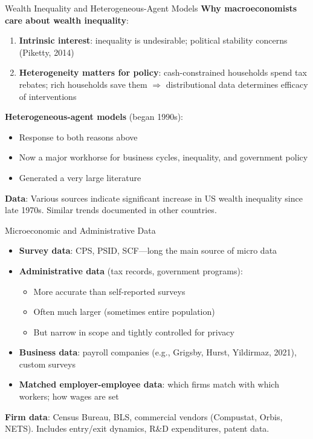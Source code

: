 \documentclass[blue]{beamer}
\begin{document}
\begin{frame}{Wealth Inequality and Heterogeneous-Agent Models}
	\textbf{Why macroeconomists care about wealth inequality}:
		\vspace{-6pt}
	\begin{enumerate}
		\item \textbf{Intrinsic interest}: inequality is undesirable; political stability concerns (Piketty, 2014)
		\item \textbf{Heterogeneity matters for policy}: cash-constrained households spend tax rebates; rich households save them $\Rightarrow$ distributional data determines efficacy of interventions
	\end{enumerate}
	
	\textbf{Heterogeneous-agent models} (began 1990s):
		\vspace{-6pt}
	\begin{itemize}
		\item Response to both reasons above
		\item Now a major workhorse for business cycles, inequality, and government policy
		\item Generated a very large literature
	\end{itemize}
	
	
	\textbf{Data}: Various sources indicate significant increase in US wealth inequality since late 1970s. Similar trends documented in other countries.
\end{frame}

\begin{frame}{Microeconomic and Administrative Data}
	\begin{itemize}
		\item \textbf{Survey data}: CPS, PSID, SCF---long the main source of micro data
		\item \textbf{Administrative data} (tax records, government programs):
		\begin{itemize}
			\item More accurate than self-reported surveys
			\item Often much larger (sometimes entire population)
			\item But narrow in scope and tightly controlled for privacy
		\end{itemize}
		\item \textbf{Business data}: payroll companies (e.g., Grigsby, Hurst, Yildirmaz, 2021), custom surveys
		\item \textbf{Matched employer-employee data}: which firms match with which workers; how wages are set
	\end{itemize}
	
	\bigskip
	\textbf{Firm data}: Census Bureau, BLS, commercial vendors (Compustat, Orbis, NETS). Includes entry/exit dynamics, R\&D expenditures, patent data.
\end{frame}
\end{document}
